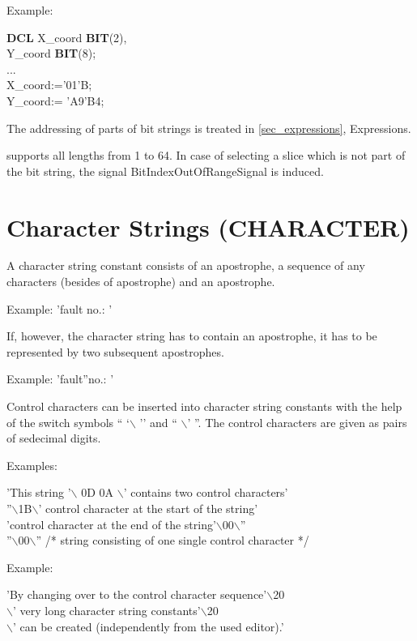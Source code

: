 Example:

{\bf DCL} X\_coord {\bf BIT}(2),\\
\x Y\_coord {\bf BIT}(8);\\
...\\
X\_coord:='01'B;\\
Y\_coord:= 'A9'B4;

The addressing of parts of bit strings is treated in 
\ref{sec_expressions}, Expressions.

\OpenPEARL{} supports all lengths from 1 to 64.
In case of selecting a slice which is not part of the bit string, the
signal BitIndexOutOfRangeSignal is induced.

\section{Character Strings (CHARACTER)}  %

A character string constant consists of an apostrophe, a sequence of any
characters (besides of apostrophe) and an apostrophe.

Example: 'fault no.: '

If, however, the character string has to contain an apostrophe, it has
to be represented by two subsequent apostrophes.

Example: 'fault''no.: '

Control characters can be inserted into character string constants with
the help of the switch symbols `` `$\backslash$ '' and `` $\backslash$'
''.  The control characters are given as pairs of sedecimal digits.

Examples:

'This string '$\backslash$ 0D 0A $\backslash$' contains two control characters'\\
''$\backslash$1B$\backslash$' control character at the start of the string'\\
'control character at the end of the string'$\backslash$00$\backslash$''\\
''$\backslash$00$\backslash$'' /* string consisting of one single control character */

Example:

'By changing over to the control character sequence'$\backslash$20\\
$\backslash$' very long character string constants'$\backslash$20\\
$\backslash$' can be created (independently from the used editor).'

